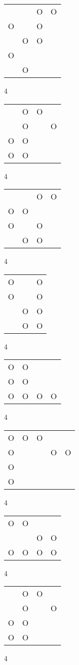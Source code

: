 \begin{tabular}{|m{0.2cm}m{0.2cm}m{0.2cm}m{0.2cm}|}\hline
 & &O&O\\
O& &O& \\
 &O&O& \\
O& & & \\
 &O& & \\
\hline\end{tabular}4
\begin{tabular}{|m{0.2cm}m{0.2cm}m{0.2cm}m{0.2cm}|}\hline
 &O&O& \\
 &O& &O\\
O&O& & \\
O&O& & \\
\hline\end{tabular}4
\begin{tabular}{|m{0.2cm}m{0.2cm}m{0.2cm}m{0.2cm}|}\hline
 & &O&O\\
O&O& & \\
O& &O& \\
 &O&O& \\
\hline\end{tabular}4
\begin{tabular}{|m{0.2cm}m{0.2cm}m{0.2cm}|}\hline
O& &O\\
O& &O\\
 &O&O\\
 &O&O\\
\hline\end{tabular}4
\begin{tabular}{|m{0.2cm}m{0.2cm}m{0.2cm}m{0.2cm}|}\hline
O&O& & \\
O&O& & \\
O&O&O&O\\
\hline\end{tabular}4
\begin{tabular}{|m{0.2cm}m{0.2cm}m{0.2cm}m{0.2cm}m{0.2cm}|}\hline
O&O&O& & \\
O& & &O&O\\
O& & & & \\
O& & & & \\
\hline\end{tabular}4
\begin{tabular}{|m{0.2cm}m{0.2cm}m{0.2cm}m{0.2cm}|}\hline
O&O& & \\
 & &O&O\\
O&O&O&O\\
\hline\end{tabular}4
\begin{tabular}{|m{0.2cm}m{0.2cm}m{0.2cm}m{0.2cm}|}\hline
 &O&O& \\
 &O& &O\\
O&O& & \\
O&O& & \\
\hline\end{tabular}4
